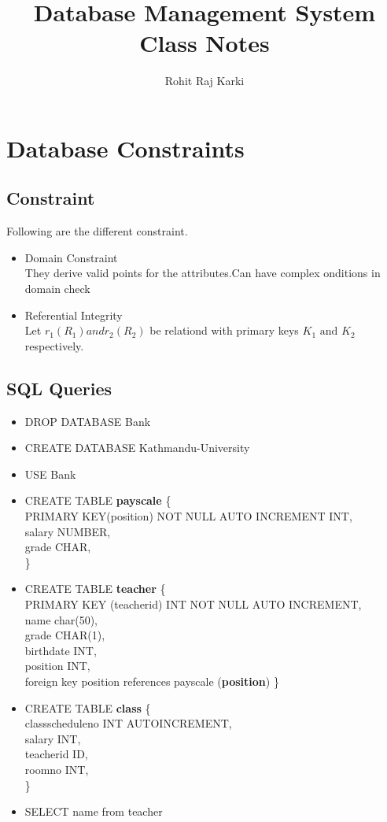 \documentclass{report}
\title{\Huge{Database Management System}\\Class Notes}
\author{\huge{Rohit Raj Karki}}
\date{}
\begin{document}
\maketitle
\newpage%
\tableofcontents
\pagebreak

\chapter{Database Constraints}
\section{Constraint}

Following are the different constraint.
\begin{itemize}
    \item Domain Constraint\\ They derive valid points for the attributes.Can have complex onditions in domain check
    \item Referential Integrity \\ Let $r_1(R_1) and r_2(R_2)$ be relationd with primary keys $K_1 \text{ and } K_2$ respectively.
\end{itemize}

\section{SQL Queries}
\begin{itemize}
    \item DROP DATABASE Bank
    \item CREATE DATABASE Kathmandu-University
    \item USE Bank
    \item CREATE TABLE \textbf{payscale} \{ \\
        PRIMARY KEY(position) NOT NULL AUTO INCREMENT INT,\\
        salary NUMBER,\\
        grade CHAR,\\
    \}
    \item CREATE TABLE \textbf{teacher} \{\\
        PRIMARY KEY (teacherid) INT NOT NULL AUTO INCREMENT,\\
        name char(50),\\
        grade CHAR(1),\\
        birthdate INT,\\
        position INT,\\
        foreign key position references payscale (\textbf{position})
    \}
    \item CREATE TABLE \textbf{class} \{\\
        classscheduleno INT AUTOINCREMENT,\\
        salary INT,\\
        teacherid ID,\\
        roomno INT,\\
    \}
    \item SELECT name from teacher 
\end{itemize}
\end{document}
